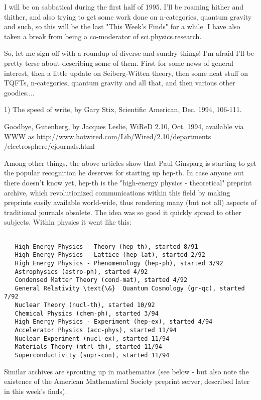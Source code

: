 

I will be on sabbatical during the first half of 1995.  I'll be roaming
hither and thither, and also trying to get some work done on n-categories,
quantum gravity and such, so this will be the last "This Week's Finds"
for a while.  I have also taken a break from being a co-moderator of
sci.physics.research.

So, let me sign off with a roundup of diverse and sundry things!  I'm
afraid I'll be pretty terse about describing some of them.  First for
some news of general interest, then a little update on Seiberg-Witten
theory, then some neat stuff on TQFTs, n-categories, quantum gravity and
all that, and then various other goodies....

1)  The speed of write, by Gary Stix, Scientific American, Dec. 1994,
106-111.  

Goodbye, Gutenberg, by Jacques Leslie, WiReD 2.10, Oct. 1994, 
available via WWW as http://www.hotwired.com/Lib/Wired/2.10/departments
/electrosphere/ejournals.html  


Among other things, the above articles show that Paul Ginsparg is
starting to get the popular recognition he deserves for starting up
hep-th.  In case anyone out there doesn't know yet, hep-th is the
"high-energy physics - theoretical" preprint archive, which
revolutionized communications within this field by making preprints
easily available world-wide, thus rendering many (but not all) aspects
of traditional journals obsolete.  The idea was so good it quickly
spread to other subjects.  Within physics it went like this:


\begin{verbatim}

   High Energy Physics - Theory (hep-th), started 8/91 
   High Energy Physics - Lattice (hep-lat), started 2/92 
   High Energy Physics - Phenomenology (hep-ph), started 3/92 
   Astrophysics (astro-ph), started 4/92 
   Condensed Matter Theory (cond-mat), started 4/92 
   General Relativity \text{\&}  Quantum Cosmology (gr-qc), started 7/92 
   Nuclear Theory (nucl-th), started 10/92 
   Chemical Physics (chem-ph), started 3/94 
   High Energy Physics - Experiment (hep-ex), started 4/94 
   Accelerator Physics (acc-phys), started 11/94 
   Nuclear Experiment (nucl-ex), started 11/94 
   Materials Theory (mtrl-th), started 11/94 
   Superconductivity (supr-con), started 11/94 
\end{verbatim}
    

Similar archives are sprouting up in mathematics (see below - but also
note the existence of the American Mathematical Society preprint server,
described later in this week's finds).  

